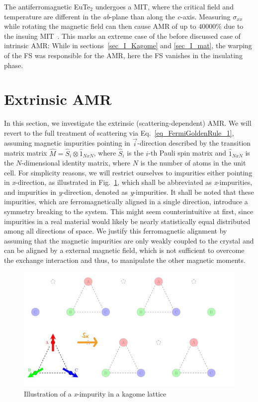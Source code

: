 \documentclass[prb,showpacs,amsmath,amssymb,superscriptaddress,twocolumn,floatfix]{revtex4-1}
\begin{document}
The antiferromagnetic EuTe$_2$ undergoes a MIT, where the critical field and temperature are different in the \textit{ab}-plane than along the \textit{c}-axis. Measuring $\sigma_{xx}$ while rotating the magnetic field can then cause AMR of up to $40000\%$ due to the insuing MIT~\cite{Yang:2021}. This marks an extreme case of the before discussed case of intrinsic AMR: While in sections~\ref{sec_I_Kagome} and \ref{sec_I_mat}, the warping of the FS was responsible for the AMR, here the FS vanishes in the insulating phase.


\section{Extrinsic AMR}
\label{sec_extrinsic}

In this section, we investigate the extrinsic (scattering-dependent) AMR. We will revert to the full treatment of scattering via Eq.~\ref{eq_FermiGoldenRule_1}, assuming magnetic impurities pointing in $\vec{i}$-direction described by the transition matrix matrix $\hat{M} = \hat{S}_i \otimes \hat{1}_{NxN}$, where $\hat{S}_i$ is the $i$-th Pauli spin matrix and $\hat{1}_{NxN}$ is the $N$-dimensional identity matrix, where $N$ is the number of atoms in the unit cell. For simplicity reasons, we will restrict ourselves to impurities either pointing in \textit{x}-direction, as illustrated in Fig.~\ref{fig:kagome21}, which shall be abbreviated as \textit{x}-impurities, and impurities in \textit{y}-direction, denoted as \textit{y}-impurities. It shall be noted that these impurities, which are ferromagnetically aligned in a single direction, introduce a symmetry breaking to the system. This might seem counterintuitive at first, since impurities in a real material would likely be nearly statistically equal distributed among all directions of space. We justify this ferromagnetic alignment by assuming that the magnetic impurities are only weakly coupled to the crystal and can be aligned by a external magnetic field, which is not sufficient to overcome the exchange interaction and thus, to manipulate the other magnetic moments.
\begin{figure}
	\centering
	\includegraphics[width=0.8\linewidth]{img/Kagome_21}
	\caption{Illustration of a \textit{x}-impurity in a kagome lattice}
	\label{fig:kagome21}
\end{figure}
\end{document}

